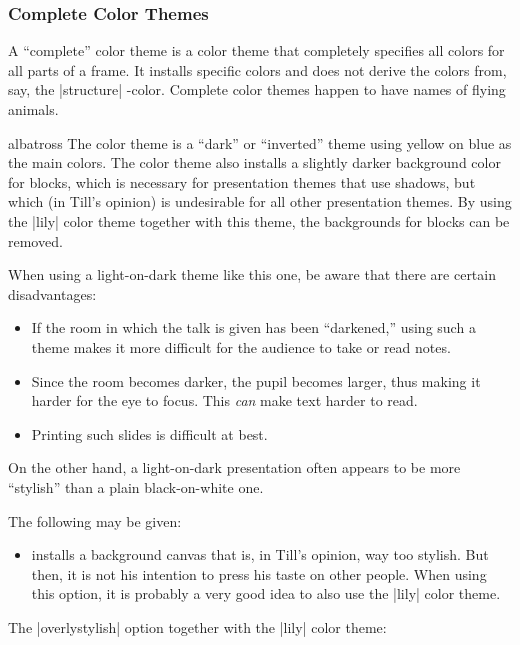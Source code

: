 \subsubsection{Complete Color Themes}

A ``complete'' color theme is a color theme that completely specifies all colors for all parts of a frame. It installs specific colors and does not derive the colors from, say, the |structure| \beamer-color. Complete color themes happen to have names of flying animals.

\begin{colorthemeexample}{albatross}
  The color theme is a ``dark'' or ``inverted'' theme using yellow on blue as the main colors. The color theme also installs a slightly darker background color for blocks, which is necessary for presentation themes that use shadows, but which (in Till's opinion) is undesirable for all other presentation themes. By using the |lily| color theme together with this theme, the backgrounds for blocks can be removed.

  When using a light-on-dark theme like this one, be aware that there are certain disadvantages:
  \begin{itemize}
  \item
    If the room in which the talk is given has been ``darkened,'' using such a theme makes it more difficult for the audience to take or read notes.
  \item
    Since the room becomes darker, the pupil becomes larger, thus making it harder for the eye to focus. This \emph{can} make text harder to read.
  \item
    Printing such slides is difficult at best.
  \end{itemize}

  On the other hand, a light-on-dark presentation often appears to be more ``stylish'' than a plain black-on-white one.

  The following  may be given:
  \begin{itemize}
  \item
     installs a background canvas that is, in Till's opinion, way too stylish. But then, it is not his intention to press his taste on other people. When using this option, it is probably a very good idea to also use the |lily| color theme.
  \end{itemize}

  \example
  The |overlystylish| option together with the |lily| color theme: 
\end{colorthemeexample}

